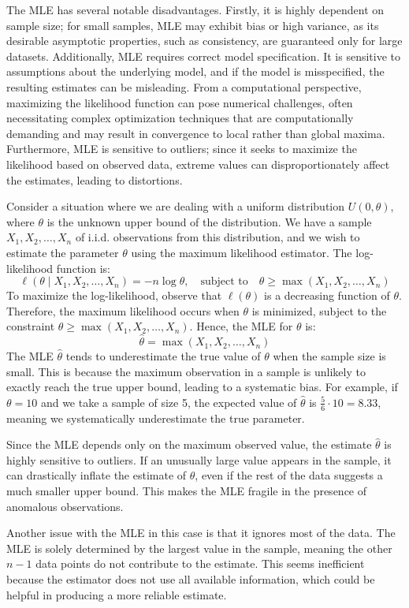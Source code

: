 The MLE has several notable disadvantages. Firstly, it is highly dependent on sample size; for small samples, MLE may exhibit bias or high variance, as its desirable asymptotic properties, such as consistency, are guaranteed only for large datasets. Additionally, MLE requires correct model specification. It is sensitive to assumptions about the underlying model, and if the model is misspecified, the resulting estimates can be misleading. From a computational perspective, maximizing the likelihood function can pose numerical challenges, often necessitating complex optimization techniques that are computationally demanding and may result in convergence to local rather than global maxima. Furthermore, MLE is sensitive to outliers; since it seeks to maximize the likelihood based on observed data, extreme values can disproportionately affect the estimates, leading to distortions.

\begin{example}
Consider a situation where we are dealing with a uniform distribution \( U(0, \theta) \), where \( \theta \) is the unknown upper bound of the distribution. We have a sample \( X_1, X_2, \dots, X_n \) of i.i.d. observations from this distribution, and we wish to estimate the parameter \( \theta \) using the maximum likelihood estimator. The log-likelihood function is:
\[
\ell(\theta \mid X_1, X_2, \dots, X_n) = -n \log \theta, \quad \text{subject to} \quad \theta \geq \max(X_1, X_2, \dots, X_n)
\]
To maximize the log-likelihood, observe that \( \ell(\theta) \) is a decreasing function of \( \theta \). Therefore, the maximum likelihood occurs when \( \theta \) is minimized, subject to the constraint \( \theta \geq \max(X_1, X_2, \dots, X_n) \). Hence, the MLE for \( \theta \) is:
\[
\hat{\theta} = \max(X_1, X_2, \dots, X_n)
\]
The MLE \( \hat{\theta} \) tends to underestimate the true value of \( \theta \) when the sample size is small. This is because the maximum observation in a sample is unlikely to exactly reach the true upper bound, leading to a systematic bias. For example, if \( \theta = 10 \) and we take a sample of size 5, the expected value of \( \hat{\theta} \) is \( \frac{5}{6} \cdot 10 = 8.33 \), meaning we systematically underestimate the true parameter.

Since the MLE depends only on the maximum observed value, the estimate \( \hat{\theta} \) is highly sensitive to outliers. If an unusually large value appears in the sample, it can drastically inflate the estimate of \( \theta \), even if the rest of the data suggests a much smaller upper bound. This makes the MLE fragile in the presence of anomalous observations.

Another issue with the MLE in this case is that it ignores most of the data. The MLE is solely determined by the largest value in the sample, meaning the other \( n-1 \) data points do not contribute to the estimate. This seems inefficient because the estimator does not use all available information, which could be helpful in producing a more reliable estimate.
\end{example}

